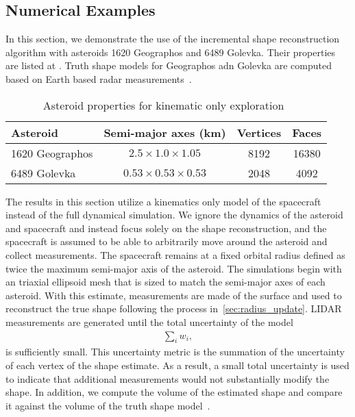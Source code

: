\documentclass[smallextended]{svjour3}       %
\begin{document}
\subsection{Numerical Examples}\label{sec:kinematic_exploration}

In this section, we demonstrate the use of the incremental shape reconstruction algorithm with asteroids 1620 Geographos and 6489 Golevka.
Their properties are listed at .
Truth shape models for Geographos adn Golevka are computed based on Earth based radar measurements~\cite{neese2004}.
\begin{table}[htbp]
    \centering
    \begin{tabular}{lccc}
        \toprule
        Asteroid & Semi-major axes (\si{\kilo\meter}) & Vertices & Faces\\
        \midrule
        \num{1620} Geographos & \( 2.5 \times 1.0 \times 1.05 \) & \num{8192} & \num{16380}  \\
        \num{6489} Golevka & \( 0.53 \times 0.53 \times 0.53 \)  & \num{2048} & \num{4092} \\
        \bottomrule
    \end{tabular} 
    \caption{Asteroid properties for kinematic only exploration~\label{tab:kinematic_asteroids}}
\end{table}

The results in this section utilize a kinematics only model of the spacecraft instead of the full dynamical simulation. 
We ignore the dynamics of the asteroid and spacecraft and instead focus solely on the shape reconstruction, and the spacecraft is assumed to be able to arbitrarily move around the asteroid and collect measurements.
The spacecraft remains at a fixed orbital radius defined as twice the maximum semi-major axis of the asteroid.
The simulations begin with an triaxial ellipsoid mesh that is sized to match the semi-major axes of each asteroid.
With this estimate, measurements are made of the surface and used to reconstruct the true shape following the process in~\cref{sec:radius_update}.
LIDAR measurements are generated until the total uncertainty of the model
\begin{align*}
    \sum_i w_i,
\end{align*}
is sufficiently small.
This uncertainty metric is the summation of the uncertainty of each vertex of the shape estimate.
As a result, a small total uncertainty is used to indicate that additional measurements would not substantially modify the shape.
In addition, we compute the volume of the estimated shape and compare it against the volume of the truth shape model~\cite{neese2004}.
\end{document}
